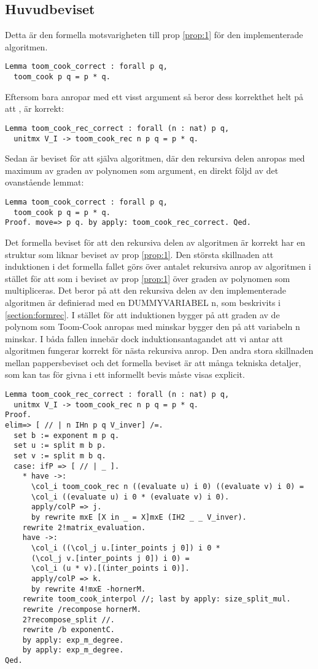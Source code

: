 \subsection{Huvudbeviset}
Detta är den formella motsvarigheten till prop \ref{prop:1} för den
implementerade algoritmen.
\begin{lstlisting}
Lemma toom_cook_correct : forall p q,
  toom_cook p q = p * q.
\end{lstlisting}
Eftersom  bara anropar  med ett visst argument så
beror dess korrekthet helt på att , är korrekt:
\begin{lstlisting}
Lemma toom_cook_rec_correct : forall (n : nat) p q,
  unitmx V_I -> toom_cook_rec n p q = p * q.
\end{lstlisting}
Sedan är beviset för att själva algoritmen, där den rekursiva delen anropas med
maximum av graden av polynomen som argument, en direkt följd av det ovanstående
lemmat:
\begin{lstlisting}
Lemma toom_cook_correct : forall p q,
  toom_cook p q = p * q.
Proof. move=> p q. by apply: toom_cook_rec_correct. Qed.
\end{lstlisting}
Det formella beviset för att den rekursiva delen av algoritmen är korrekt har
en struktur som liknar beviset av prop \ref{prop:1}. Den största skillnaden att
induktionen i det formella fallet görs över antalet rekursiva anrop av
algoritmen i stället för att som i beviset av prop \ref{prop:1} över graden av
polynomen som multipliceras. Det beror på att den rekursiva delen av den
implementerade algoritmen är definierad med en DUMMYVARIABEL n, som beskrivits
i \ref{section:formrec}. I stället för att induktionen bygger på att graden av
de polynom som Toom-Cook anropas med minskar bygger den på att variabeln n
minskar. I båda fallen innebär dock induktionsantagandet att vi antar att
algoritmen fungerar korrekt för nästa rekursiva anrop. Den andra stora
skillnaden mellan pappersbeviset och det formella beviset är att många tekniska
detaljer, som kan tas för givna i ett informellt bevis måste visas explicit.
\begin{lstlisting}
Lemma toom_cook_rec_correct : forall (n : nat) p q,
  unitmx V_I -> toom_cook_rec n p q = p * q.
Proof.
elim=> [ // | n IHn p q V_inver] /=.
  set b := exponent m p q.
  set u := split m b p.
  set v := split m b q.
  case: ifP => [ // | _ ].
    * have ->:
      \col_i toom_cook_rec n ((evaluate u) i 0) ((evaluate v) i 0) =
      \col_i ((evaluate u) i 0 * (evaluate v) i 0).
      apply/colP => j.
      by rewrite mxE [X in _ = X]mxE (IH2 _ _ V_inver).
    rewrite 2!matrix_evaluation.
    have ->:
      \col_i ((\col_j u.[inter_points j 0]) i 0 *
      (\col_j v.[inter_points j 0]) i 0) =
      \col_i (u * v).[(inter_points i 0)].
      apply/colP => k.
      by rewrite 4!mxE -hornerM.
    rewrite toom_cook_interpol //; last by apply: size_split_mul.
    rewrite /recompose hornerM.
    2?recompose_split //.
    rewrite /b exponentC.
    by apply: exp_m_degree.
    by apply: exp_m_degree.
Qed.
\end{lstlisting}
